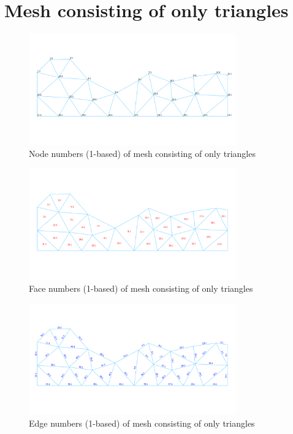 \documentclass[biblatex]{deltares_memo}
\begin{document}
\section{Mesh consisting of only triangles \label{sec:triangles}}
\begin{figure}[H]	
	\centering
	\includegraphics[width=0.8\textwidth]{pictures/node_numbers_triangles.png}
	\caption{Node numbers (1-based) of mesh consisting of only triangles}
\end{figure}
\begin{figure}[H]	
	\centering
	\includegraphics[width=0.8\textwidth]{pictures/face_numbers_triangles.png}
	\caption{Face numbers (1-based) of mesh consisting of only triangles}
\end{figure}
\begin{figure}[H]	
	\centering
	\includegraphics[width=0.8\textwidth]{pictures/edge_numbers_triangles.png}
	\caption{Edge numbers (1-based) of mesh consisting of only triangles}
\end{figure}
\end{document}

